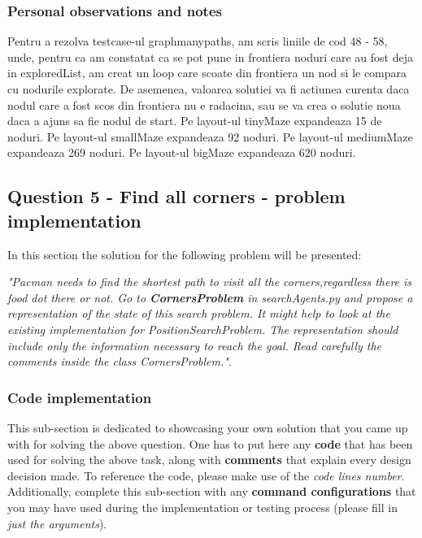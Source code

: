 \subsubsection{Personal observations and notes}
 \newline
Pentru a rezolva testcase-ul graphmanypaths, am scris liniile de cod 48 - 58, unde, pentru ca am constatat ca se pot pune in frontiera noduri care au fost deja in exploredList, am creat un loop care scoate din frontiera un nod si le compara cu nodurile explorate. De asemenea, valoarea solutiei va fi actiunea curenta daca nodul care a fost scos din frontiera nu e radacina, sau se va crea o solutie noua daca a ajuns sa fie nodul de start. \newline
Pe layout-ul tinyMaze expandeaza 15 de noduri. \newline
Pe layout-ul smallMaze expandeaza 92 noduri. \newline
Pe layout-ul mediumMaze expandeaza 269 noduri. \newline
Pe layout-ul bigMaze expandeaza 620 noduri. 

\vspace{0.75cm}

\subsection{Question 5 - Find all corners - problem implementation}
In this section the solution for the following problem will be presented: \newline


\textit{"Pacman  needs  to  find  the  shortest  path  to  visit  all  the  corners,regardless  there  is  food  dot  there  or  not. Go to \textbf{CornersProblem} in searchAgents.py and propose a representation of the state of this search problem. It might help to look at the existing implementation for PositionSearchProblem. The representation should include only the information necessary to reach the goal. Read carefully the comments inside the class CornersProblem."}.


\subsubsection{Code implementation}
This sub-section is dedicated to showcasing your own solution that you came up with for solving the above question. One has to put here any \textbf{code} that has been used for solving the above task, along with \textbf{comments} that explain every design decision made. To reference the code, please make use of the \textit{code lines number}. Additionally, complete this sub-section with any \textbf{command configurations} that you may have used during the implementation or testing process (please fill in \textit{just the arguments}). \\

